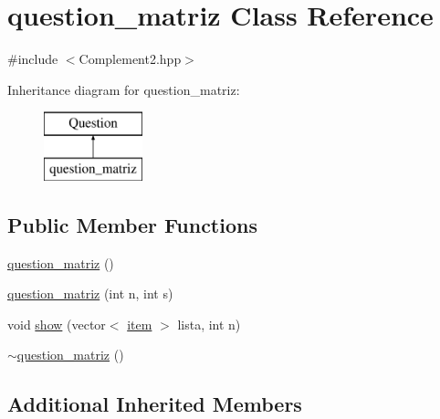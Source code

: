 \hypertarget{classquestion__matriz}{\section{question\+\_\+matriz Class Reference}
\label{classquestion__matriz}
}


{\ttfamily \#include $<$Complement2.\+hpp$>$}

Inheritance diagram for question\+\_\+matriz\+:\begin{figure}[H]
\begin{center}
\leavevmode
\includegraphics[height=2.000000cm]{classquestion__matriz}
\end{center}
\end{figure}
\subsection*{Public Member Functions}
\begin{DoxyCompactItemize}
\item 
\hyperlink{classquestion__matriz_ae3da8a30e2d7c23a4ca4cc59966f6bc7}{question\+\_\+matriz} ()
\item 
\hyperlink{classquestion__matriz_a8bbc3dc985d29946cad67cf328835714}{question\+\_\+matriz} (int n, int s)
\item 
void \hyperlink{classquestion__matriz_a1b6543dc9f0ff36cf44ccb47a141ca99}{show} (vector$<$ \hyperlink{classitem}{item} $>$ lista, int n)
\item 
\hyperlink{classquestion__matriz_a4f6443c7deab499e22cc820fab59d705}{$\sim$question\+\_\+matriz} ()
\end{DoxyCompactItemize}
\subsection*{Additional Inherited Members}


